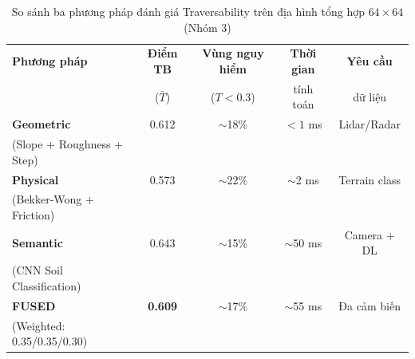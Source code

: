 
\begin{table}[htbp]
\centering
\caption{So sánh ba phương pháp đánh giá Traversability trên địa hình tổng hợp $64\times64$ (Nhóm 3)}
\label{tab:traversability}
\begin{tabular}{lcccc}
    \toprule
    \textbf{Phương pháp} & \textbf{Điểm TB} & \textbf{Vùng nguy hiểm} & \textbf{Thời gian} & \textbf{Yêu cầu} \\
                         & ($\bar{T}$) & ($T < 0.3$) & tính toán & dữ liệu \\
    \midrule
    \textbf{Geometric}   & 0.612 & $\sim$18\% & $< 1$ ms & Lidar/Radar \\
    (Slope + Roughness + Step) & & & & \\
    \textbf{Physical}    & 0.573 & $\sim$22\% & $\sim$2 ms & Terrain class \\
    (Bekker-Wong + Friction) & & & & \\
    \textbf{Semantic}    & 0.643 & $\sim$15\% & $\sim$50 ms & Camera + DL \\
    (CNN Soil Classification) & & & & \\
    \midrule
    \textbf{FUSED}       & \textbf{0.609} & $\sim$17\% & $\sim$55 ms & Đa cảm biến \\
    (Weighted: 0.35/0.35/0.30) & & & & \\
    \bottomrule
\end{tabular}
\end{table}

